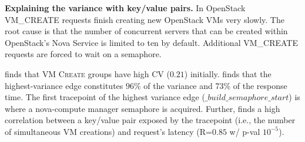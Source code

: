\noindent\textbf{Explaining the variance with key/value pairs.}  
In OpenStack \textsc{VM\_CREATE} requests finish creating new OpenStack VMs very slowly. 
The root cause is that the
number of concurrent servers that can be created within OpenStack's Nova Service is limited to ten by default. 
Additional \textsc{VM\_CREATE} requests are forced to wait on a semaphore.

\staif{} finds that \textsc{VM Create} groups have high CV ($0.21$) initially.
\staif{} finds that the highest-variance edge constitutes
$96\%$ of the variance and 73\% of the response time.  The first
tracepoint of the highest variance edge ($\_build\_semaphore\_start$)
is where a nova-compute manager semaphore is acquired.
Further, \staif{} finds a high correlation between a key/value pair
exposed by the tracepoint (i.e., the number of simultaneous VM
creations) and request's latency (R=$0.85$ w/ p-val $10^{-5}$).